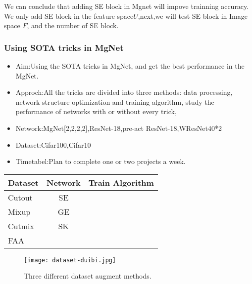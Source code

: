 We can conclude that adding SE block in Mgnet will impove trainning accuracy. We only add SE block in the feature space$U$,next,we will test SE block in Image space $F$, and the number of SE block.\\

\subsubsection{Using SOTA tricks in MgNet}
\begin{itemize}
	\item Aim:Using the SOTA tricks in MgNet, and get the best performance in the MgNet.\\
	\item Approch:All the tricks are divided into three methods: data processing, network structure optimization and training algorithm, study the performance of networks with or without every trick, \\
	\item Network:MgNet[2,2,2,2],ResNet-18,pre-act ResNet-18,WResNet40*2\\
	\item Dataset:Cifar100,Cifar10\\
	\item Timetabel:Plan to complete one or two projects a week.
\end{itemize}


\begin{tabular}{| l |  c  | r |}
	\hline
	Dataset             &      Network   &           Train Algorithm\\
	\hline
	Cutout              &       SE       &            \\
	\hline
	Mixup               &       GE       &            \\
	\hline
	Cutmix              &       SK       &             \\
	\hline
	FAA                 &                &             \\
	\hline
\end{tabular}


\begin{figure}[H]
	\centering
	\texttt{[image: dataset-duibi.jpg]}
	\caption{Three different dataset augment methods.}\label{Three different dataset augment methods.}
\end{figure}


